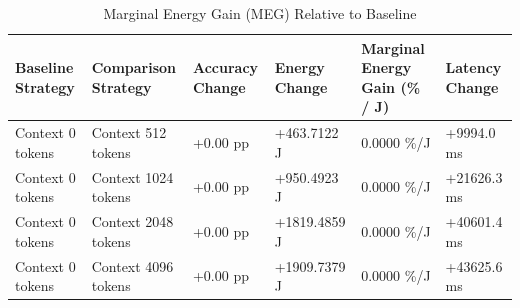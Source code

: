 \begin{table}
\caption{Marginal Energy Gain (MEG) Relative to Baseline}
\label{tab:marginal_energy_gain}
\begin{tabular}{llllll}
\toprule
Baseline Strategy & Comparison Strategy & Accuracy Change & Energy Change & Marginal Energy Gain (\% / J) & Latency Change \\
\midrule
Context 0 tokens & Context 512 tokens & +0.00 pp & +463.7122 J & 0.0000 \%/J & +9994.0 ms \\
Context 0 tokens & Context 1024 tokens & +0.00 pp & +950.4923 J & 0.0000 \%/J & +21626.3 ms \\
Context 0 tokens & Context 2048 tokens & +0.00 pp & +1819.4859 J & 0.0000 \%/J & +40601.4 ms \\
Context 0 tokens & Context 4096 tokens & +0.00 pp & +1909.7379 J & 0.0000 \%/J & +43625.6 ms \\
\bottomrule
\end{tabular}
\end{table}
